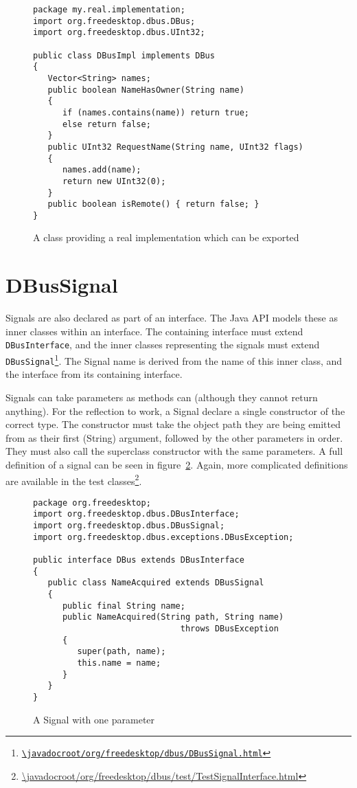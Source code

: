 \documentclass[a4paper,12pt]{article}
\begin{document}
\begin{figure}[htb]
\begin{center}
\begin{verbatim}
package my.real.implementation;
import org.freedesktop.dbus.DBus;
import org.freedesktop.dbus.UInt32;

public class DBusImpl implements DBus
{
   Vector<String> names;
   public boolean NameHasOwner(String name)
   {
      if (names.contains(name)) return true;
      else return false;
   }
   public UInt32 RequestName(String name, UInt32 flags)
   {
      names.add(name);
      return new UInt32(0);
   }
   public boolean isRemote() { return false; }
}
\end{verbatim}
\end{center}
\caption{A class providing a real implementation which can be exported}
\label{fig:class}
\end{figure}

\section{DBusSignal}

Signals are also declared as part of an interface. The Java API
models these as inner classes within an interface. The containing
interface must extend {\tt DBusInterface}, and the inner classes
representing the signals must extend {\tt
DBusSignal\footnote{\url{\javadocroot/org/freedesktop/dbus/DBusSignal.html}}}.
The Signal name is derived from the name of this inner class, and
the interface from its containing interface.

Signals can take parameters as methods can (although they cannot return
      anything). For the reflection to work, a Signal declare a single
constructor of the correct type. The constructor must  take the object path
they are being emitted from as their first (String) argument, followed by the
other parameters in order. They must also call the superclass constructor with
the same parameters.  A full definition of a signal can be seen in
figure~\ref{fig:signal}. Again, more complicated definitions are available in
the test
classes\footnote{\url{\javadocroot/org/freedesktop/dbus/test/TestSignalInterface.html}}.

\begin{figure}[htb]
\begin{center}
\begin{verbatim}
package org.freedesktop;
import org.freedesktop.dbus.DBusInterface;
import org.freedesktop.dbus.DBusSignal;
import org.freedesktop.dbus.exceptions.DBusException;

public interface DBus extends DBusInterface
{
   public class NameAcquired extends DBusSignal
   {
      public final String name;
      public NameAcquired(String path, String name) 
                              throws DBusException
      {
         super(path, name);
         this.name = name;
      }
   }
}
\end{verbatim}
\end{center}
\caption{A Signal with one parameter}
\label{fig:signal}
\end{figure}
\end{document}
